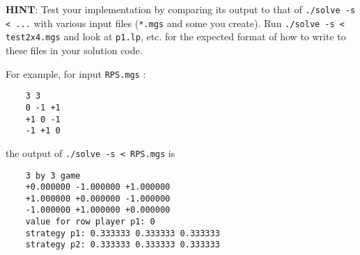 \documentclass[a4paper,11pt]{article}
\begin{document}
\medskip

\textbf{HINT}: Test your implementation by comparing its output to that of \texttt{./solve -s < ...}
with various input files (\texttt{*.mgs} and some you create).
Run \texttt{./solve -s < test2x4.mgs} and look at \texttt{p1.lp}, etc. for the expected format of 
how to write to these files in your solution code.

\medskip

For example, for input \texttt{RPS.mgs} :
\small{
\begin{verbatim}
    3 3
    0 -1 +1
    +1 0 -1
    -1 +1 0
\end{verbatim}
}

the output of \texttt{./solve -s < RPS.mgs} is
\small{
\begin{verbatim}
    3 by 3 game
    +0.000000 -1.000000 +1.000000 
    +1.000000 +0.000000 -1.000000 
    -1.000000 +1.000000 +0.000000 
    value for row player p1: 0
    strategy p1: 0.333333 0.333333 0.333333
    strategy p2: 0.333333 0.333333 0.333333
\end{verbatim}
}
\end{document}

